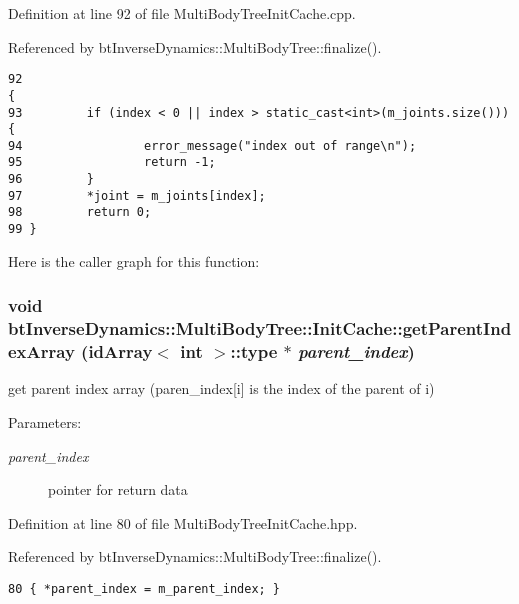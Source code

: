 Definition at line 92 of file MultiBodyTreeInitCache.cpp.

Referenced by btInverseDynamics::MultiBodyTree::finalize().

\begin{Code}\begin{verbatim}92                                                                                 {
93         if (index < 0 || index > static_cast<int>(m_joints.size())) {
94                 error_message("index out of range\n");
95                 return -1;
96         }
97         *joint = m_joints[index];
98         return 0;
99 }
\end{verbatim}
\end{Code}




Here is the caller graph for this function:\hypertarget{classbt_inverse_dynamics_1_1_multi_body_tree_1_1_init_cache_e176197bd93ec8b395b9f9c0b538458c}{
\subsubsection[getParentIndexArray]{\setlength{\rightskip}{0pt plus 5cm}void btInverseDynamics::MultiBodyTree::InitCache::getParentIndexArray (idArray$<$ int $>$::type $\ast$ {\em parent\_\-index})}}
\label{classbt_inverse_dynamics_1_1_multi_body_tree_1_1_init_cache_e176197bd93ec8b395b9f9c0b538458c}


get parent index array (paren\_\-index\mbox{[}i\mbox{]} is the index of the parent of i) \begin{Desc}
\item[Parameters:]
\begin{description}
\item[{\em parent\_\-index}]pointer for return data \end{description}
\end{Desc}


Definition at line 80 of file MultiBodyTreeInitCache.hpp.

Referenced by btInverseDynamics::MultiBodyTree::finalize().

\begin{Code}\begin{verbatim}80 { *parent_index = m_parent_index; }
\end{verbatim}
\end{Code}




